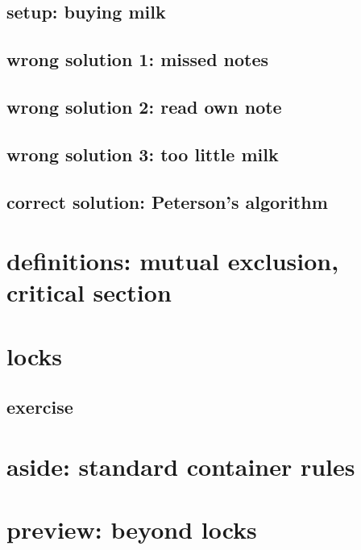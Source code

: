 \subsection{setup: buying milk}


\subsection{wrong solution 1: missed notes}


\subsection{wrong solution 2: read own note}


\subsection{wrong solution 3: too little milk}


\subsection{correct solution: Peterson's algorithm}


\section{definitions: mutual exclusion, critical section}



\section{locks}


\subsection{exercise}


\section{aside: standard container rules}


\section{preview: beyond locks}


